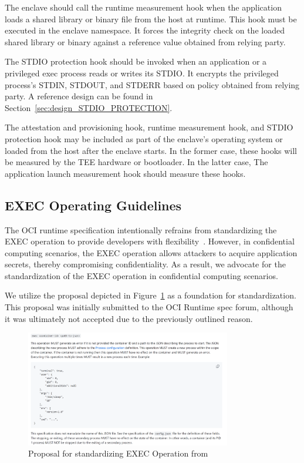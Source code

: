    
  The enclave should call the runtime measurement hook when the application loads a shared library or binary file from the host at runtime. This hook must be executed in the enclave namespace. It forces the integrity check on the loaded shared library or binary against a reference value obtained from relying party.    
   
   
  The STDIO protection hook should be invoked when an application or a privileged exec process reads or writes its STDIO. It encrypts the privileged process's STDIN, STDOUT, and STDERR based on policy obtained from relying party. A reference design can be found in Section~\ref{sec:design_STDIO_PROTECTION}.
   
  The attestation and provisioning hook, runtime measurement hook, and STDIO protection hook may be included as part of the enclave's operating system or loaded from the host after the enclave starts. In the former case, these hooks will be measured by the TEE hardware or bootloader. In the latter case, The application launch measurement hook should measure 
  these hooks. 
\subsection{EXEC Operating Guidelines}
\label{subsec:oci_exec}
The OCI runtime specification intentionally refrains from standardizing the EXEC operation to provide developers with flexibility~\cite*{exec_semantics}. However, in confidential computing scenarios, the EXEC operation allows attackers to acquire application secrets, thereby compromising confidentiality. As a result, we advocate for the standardization of the 
EXEC operation in confidential computing scenarios.
 
We utilize the proposal depicted in Figure~\ref{fig:exec_propose} as a foundation for standardization. This proposal was initially submitted to the OCI Runtime spec forum, although it was ultimately not accepted due to the previously outlined reason.
 
\begin{figure}[!htb]
    \centering
    \includegraphics[width=0.8\textwidth]{images/exec_propose.png}
    \caption[Proposal for standardizing EXEC operation]{Proposal for standardizing EXEC Operation from~\cite*{exec_proposal} }
    \label{fig:exec_propose}
\end{figure}
 
